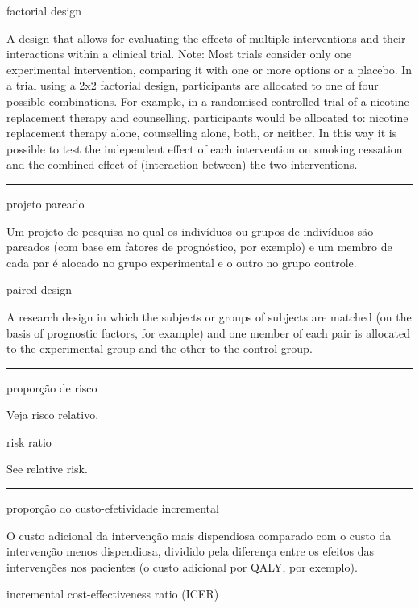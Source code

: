 \documentclass[
  openany]{book}
\begin{document}
factorial design

A design that allows for evaluating the effects of multiple interventions and their interactions within a clinical trial. Note: Most trials consider only one experimental intervention, comparing it with one or more options or a placebo. In a trial using a 2x2 factorial design, participants are allocated to one of four possible combinations. For example, in a randomised controlled trial of a nicotine replacement therapy and counselling, participants would be allocated to: nicotine replacement therapy alone, counselling alone, both, or neither. In this way it is possible to test the independent effect of each intervention on smoking cessation and the combined effect of (interaction between) the two interventions.

\begin{center}\rule{0.5\linewidth}{0.5pt}\end{center}

projeto pareado

Um projeto de pesquisa no qual os indivíduos ou grupos de indivíduos são pareados (com base em fatores de prognóstico, por exemplo) e um membro de cada par é alocado no grupo experimental e o outro no grupo controle.

paired design

A research design in which the subjects or groups of subjects are matched (on the basis of prognostic factors, for example) and one member of each pair is allocated to the experimental group and the other to the control group.

\begin{center}\rule{0.5\linewidth}{0.5pt}\end{center}

proporção de risco

Veja risco relativo.

risk ratio

See relative risk.

\begin{center}\rule{0.5\linewidth}{0.5pt}\end{center}

proporção do custo-efetividade incremental

O custo adicional da intervenção mais dispendiosa comparado com o custo da intervenção menos dispendiosa, dividido pela diferença entre os efeitos das intervenções nos pacientes (o custo adicional por QALY, por exemplo).

incremental cost-effectiveness ratio (ICER)
\end{document}
